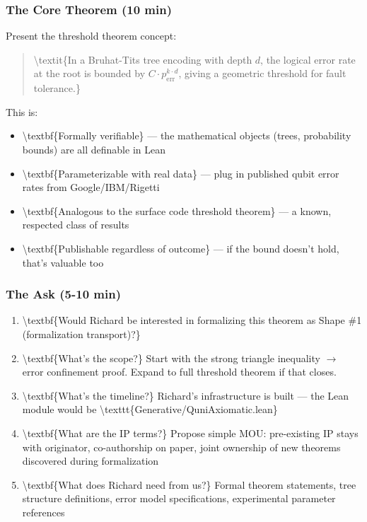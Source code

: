 \documentclass[11pt,a4paper]{article}
\begin{document}
\subsubsection{The Core Theorem (10 min)}


Present the threshold theorem concept:

\begin{quote}
\textbackslash{}textit\{In a Bruhat-Tits tree encoding with depth $d$, the logical error rate at the root is bounded by $C \cdot p_{\text{err}}^{k \cdot d}$, giving a geometric threshold for fault tolerance.\}
\end{quote}


This is:
\begin{itemize}
\item \textbackslash{}textbf\{Formally verifiable\}  --- the mathematical objects (trees, probability bounds) are all definable in Lean
\item \textbackslash{}textbf\{Parameterizable with real data\}  --- plug in published qubit error rates from Google/IBM/Rigetti
\item \textbackslash{}textbf\{Analogous to the surface code threshold theorem\}  --- a known, respected class of results
\item \textbackslash{}textbf\{Publishable regardless of outcome\}  --- if the bound doesn't hold, that's valuable too
\end{itemize}


\subsubsection{The Ask (5-10 min)}


\begin{enumerate}
\item \textbackslash{}textbf\{Would Richard be interested in formalizing this theorem as Shape \#1 (formalization transport)?\}
\item \textbackslash{}textbf\{What's the scope?\} Start with the strong triangle inequality $\to$ error confinement proof. Expand to full threshold theorem if that closes.
\item \textbackslash{}textbf\{What's the timeline?\} Richard's infrastructure is built  --- the Lean module would be \textbackslash{}texttt\{Generative/QuniAxiomatic.lean\}
\item \textbackslash{}textbf\{What are the IP terms?\} Propose simple MOU: pre-existing IP stays with originator, co-authorship on paper, joint ownership of new theorems discovered during formalization
\item \textbackslash{}textbf\{What does Richard need from us?\} Formal theorem statements, tree structure definitions, error model specifications, experimental parameter references
\end{enumerate}
\end{document}
